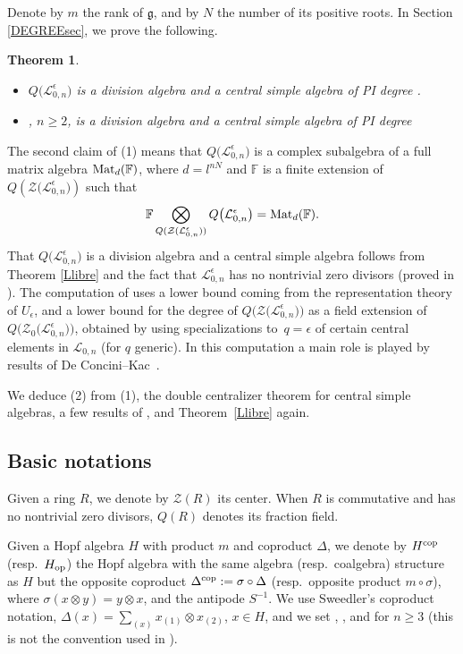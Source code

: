 \documentclass[pdftex]{sigma}
\numberwithin{equation}{section}
\newtheorem{teo}{Theorem}[section]
\theoremstyle{definition}
\newcommand{\e}{\epsilon}
\newcommand{\Ll}{{\mathcal L}}
\begin{document}
Denote by $m$ the rank of $\mathfrak{g}$, and by $N$ the number of its positive roots. In Section \ref{DEGREEsec}, we prove the following.

\begin{teo}\label{degree} \quad
\begin{itemize}\itemsep=0pt
\item[$(1)$] $Q\bigl(\Ll_{0,n}^\e\bigr)$ is a division algebra and a central simple algebra of PI degree .
\item[$(2)$] \smash{$Q\big(\bigl(\Ll_{0,n}^\e\bigr)^{U_\e}\!\big)$}, $n\!\geq\! 2$, is a division algebra and a central simple algebra of PI degree~
 \end{itemize}
\end{teo}

The second claim of (1) means that $Q\bigl(\Ll_{0,n}^\e\bigr)$ is a complex subalgebra of a full matrix algebra ${\rm Mat}_d(\mathbb{F})$, where $d=l^{nN}$ and $\mathbb{F}$ is a finite extension of $Q(\mathcal{Z}\bigl(\Ll_{0,n}^\e\bigr))$ such that
\[\mathbb{F}\bigotimes_{Q(\mathcal{Z} (\Ll_{0,n}^\e ))} Q\bigl(\Ll_{0,n}^\e\bigr) = {\rm Mat}_d(\mathbb{F}).\]
That $Q\bigl(\Ll_{0,n}^\e\bigr)$ is a division algebra and a central simple algebra follows from Theorem \ref{Llibre} and the fact that $\Ll_{0,n}^\e$ has no nontrivial zero divisors (proved in \cite{BR}). The computation of  uses a lower bound coming from the representation theory of $U_\e$, and a lower bound for the degree of $Q\bigl(\mathcal{Z}\bigl(\Ll_{0,n}^\e\bigr)\bigr)$ as a field extension of $Q\bigl(\mathcal{Z}_0\bigl(\Ll_{0,n}^\e\bigr)\bigr)$, obtained by using specializations to~${q=\e}$ of certain central elements in $\Ll_{0,n}$ (for $q$ generic). In this computation a main role is played by results of De Concini--Kac~\cite{DC-K}.


We deduce (2) from (1), the double centralizer theorem for central simple algebras, a few results of \cite{BR,DC-L}, and Theorem~\ref{Llibre} again.

\subsection{Basic notations} Given a ring $R$, we denote by $\mathcal{Z}(R)$ its center. When $R$ is commutative and has no nontrivial zero divisors, $Q(R)$ denotes its fraction field.

Given a Hopf algebra $H$ with product $m$ and coproduct $\Delta$, we denote by $H^{\rm cop}$ (resp.~$H_{\rm op}$) the Hopf algebra with the same algebra (resp.\ coalgebra) structure as $H$ but the opposite coproduct $\Delta^{\rm cop}:=\sigma \circ {\Delta}$ (resp.\ opposite product $m\circ \sigma$), where $\sigma(x\otimes y) = y\otimes x$, and the antipode ${S}^{-1}$. We use Sweedler's coproduct notation, $ \Delta(x) = \sum_{(x)}x_{(1)} \otimes x_{(2)}$, $x\in H$, and we set , , and  for $n\geq 3$ (this is not the convention used in \cite{BR}).
\end{document}
